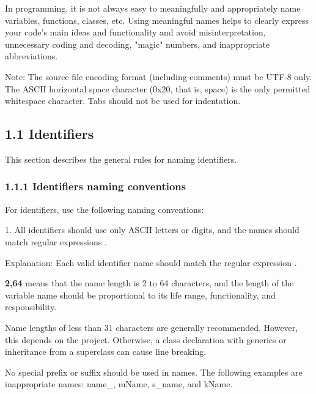 {{{{{{{{\label{sec:1.}

In programming, it is not always easy to meaningfully and appropriately name variables, functions, classes, etc. Using meaningful names helps to clearly express your code's main ideas and functionality and avoid misinterpretation, unnecessary coding and decoding, "magic" numbers, and inappropriate abbreviations.



Note: The source file encoding format (including comments) must be UTF-8 only. The ASCII horizontal space character (0x20, that is, space) is the only permitted whitespace character. Tabs should not be used for indentation.



\subsection*{\textbf{1.1 Identifiers}}

\label{sec:1.1}

This section describes the general rules for naming identifiers.

\subsubsection*{\textbf{1.1.1 Identifiers naming conventions}}
\leavevmode\newline

\label{sec:1.1.1}



For identifiers, use the following naming conventions:

1.	All identifiers should use only ASCII letters or digits, and the names should match regular expressions \textbf{}.

Explanation: Each valid identifier name should match the regular expression \textbf{}.

\textbf{{2,64}} means that the name length is 2 to 64 characters, and the length of the variable name should be proportional to its life range, functionality, and responsibility.

Name lengths of less than 31 characters are generally recommended. However, this depends on the project. Otherwise, a class declaration with generics or inheritance from a superclass can cause line breaking.

No special prefix or suffix should be used in names. The following examples are inappropriate names: name\_, mName, s\_name, and kName.



}}}}}}}}

